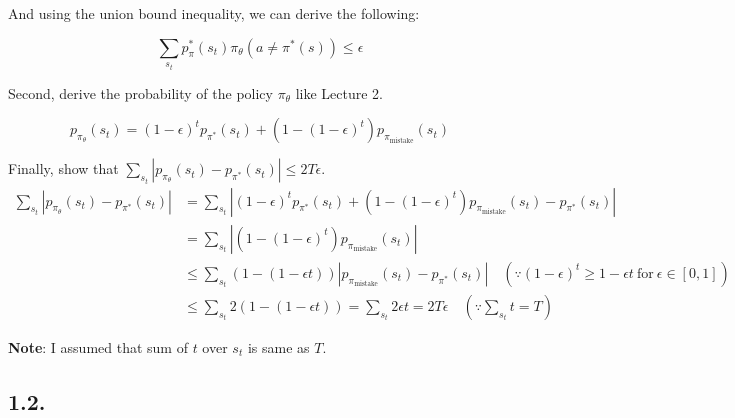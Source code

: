 \documentclass{article}%
\begin{document}
And using the union bound inequality, we can derive the following:

\begin{equation}
\sum_{s_t}p^*_\pi(s_t)\pi_\theta(a \neq \pi^*(s)) \leq \epsilon
\end{equation}

\newpage
Second, derive the probability of the policy $\pi_\theta$ like Lecture 2.

\begin{equation}
	p_{\pi_\theta}(s_t) = (1 - \epsilon)^t p_{\pi^*}(s_t) + (1 - (1 - \epsilon)^t) p_{\pi_\text{mistake}}(s_t)
\end{equation}

Finally, show that $\sum_{s_t} |p_{\pi_\theta}(s_t) - p_{\pi^*}(s_t)| \leq 2T\epsilon$.
\begin{align*}
	\sum_{s_t} |p_{\pi_\theta}(s_t) - p_{\pi^*}(s_t)| &= \sum_{s_t} |(1 - \epsilon)^t p_{\pi^*}(s_t) + (1 - (1 - \epsilon)^t) p_{\pi_\text{mistake}}(s_t) - p_{\pi^*}(s_t)| \\
	&= \sum_{s_t} |(1 - (1 - \epsilon)^t) p_{\pi_\text{mistake}}(s_t)| \\
	&\leq \sum_{s_t} (1 - (1-\epsilon t)) |p_{\pi_\text{mistake}}(s_t) - p_{\pi^*}(s_t)| \quad (\because (1-\epsilon)^t \geq 1-\epsilon t\ \text{for}\ \epsilon \in [0, 1])\\
	&\leq \sum_{s_t} 2(1 - (1-\epsilon t)) = \sum_{s_t} 2\epsilon t = 2T\epsilon \quad (\because \sum_{s_t}t = T)
\end{align*}

\textbf{Note}: I assumed that sum of $t$ over $s_t$ is same as $T$.

\subsection*{1.2.}
\end{document}
